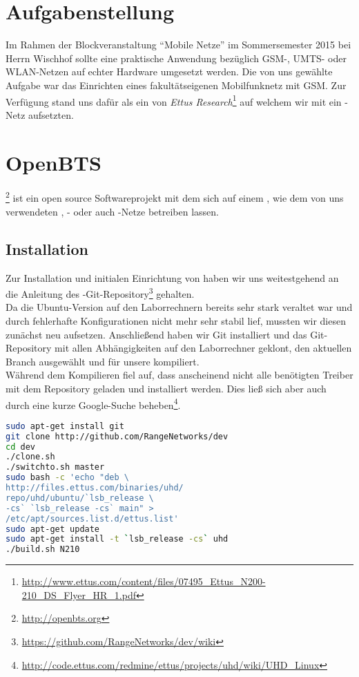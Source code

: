\section{Aufgabenstellung}
\label{sec:aufgabe}

Im Rahmen der Blockveranstaltung ``Mobile Netze'' im Sommersemester 2015 bei Herrn Wischhof sollte eine praktische Anwendung bezüglich GSM-, UMTS- oder WLAN-Netzen auf echter Hardware umgesetzt werden. Die von uns gewählte Aufgabe war das Einrichten eines fakultätseigenen Mobilfunknetz mit GSM.
Zur Verfügung stand uns dafür als \SDR ein \USRP von \emph{Ettus Research}\footnote{\url{http://www.ettus.com/content/files/07495_Ettus_N200-210_DS_Flyer_HR_1.pdf}} auf welchem wir mit \OpenBTS ein \GSM-Netz aufsetzten.

\section{OpenBTS}
\label{sec:openbts}

\OpenBTS\footnote{\url{http://openbts.org}} ist ein open source Softwareprojekt mit dem sich auf einem \SDR, wie dem von uns verwendeten , \GSM- oder auch \UMTS-Netze betreiben lassen.

\subsection{Installation}
\label{sec:installation}

Zur Installation und initialen Einrichtung von \OpenBTS haben wir uns weitestgehend an die Anleitung des \OpenBTS-Git-Repository\footnote{\url{https://github.com/RangeNetworks/dev/wiki}} gehalten.\\Da die Ubuntu-Version auf den Laborrechnern bereits sehr stark veraltet war und durch fehlerhafte Konfigurationen nicht mehr sehr stabil lief, mussten wir diesen zunächst neu aufsetzen. Anschließend haben wir Git installiert und das Git-Repository mit allen
Abhängigkeiten auf den Laborrechner geklont, den aktuellen Branch ausgewählt und für unsere \USRP kompiliert.\\Während dem Kompilieren fiel auf, dass anscheinend nicht alle benötigten Treiber mit dem Repository geladen und installiert werden. Dies ließ sich aber auch durch eine kurze Google-Suche beheben\footnote{\url{http://code.ettus.com/redmine/ettus/projects/uhd/wiki/UHD_Linux}}.

\begin{lstlisting}[language=bash]
sudo apt-get install git
git clone http://github.com/RangeNetworks/dev
cd dev
./clone.sh
./switchto.sh master
sudo bash -c 'echo "deb \
http://files.ettus.com/binaries/uhd/
repo/uhd/ubuntu/`lsb_release \
-cs` `lsb_release -cs` main" >
/etc/apt/sources.list.d/ettus.list'
sudo apt-get update
sudo apt-get install -t `lsb_release -cs` uhd
./build.sh N210
\end{lstlisting}

